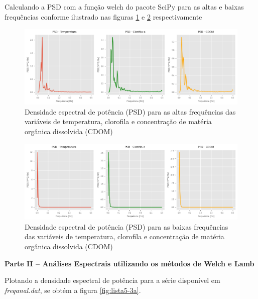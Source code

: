 \documentclass[12pt,a4paper,portuguese]{article}
\begin{document}
Calculando a PSD com a função welch do pacote SciPy para as altas e baixas frequências conforme ilustrado nas figuras \ref{fig:lista5-2c} e \ref{fig:lista5-2d} respectivamente
	\begin{figure}[H]
		\centering
		\includegraphics[width=1\linewidth]{lista5-2c}
		\caption{Densidade espectral de potência (PSD) para as altas frequências das variáveis de temperatura, clorofila e concentração de matéria orgânica dissolvida (CDOM) }
		\label{fig:lista5-2c}
	\end{figure}
		\begin{figure}[H]
		\centering
		\includegraphics[width=1\linewidth]{lista5-2d}
		\caption{Densidade espectral de potência (PSD) para as baixas frequências das variáveis de temperatura, clorofila e concentração de matéria orgânica dissolvida (CDOM) }
		\label{fig:lista5-2d}
	\end{figure}

	
	
\textbf{Parte II – Análises Espectrais utilizando os métodos de Welch e Lamb}

Plotando a densidade espectral de potência para a série disponível em \textit{freqanal.dat}, se obtém a figura \ref{fig:lista5-3a}.
\end{document}
